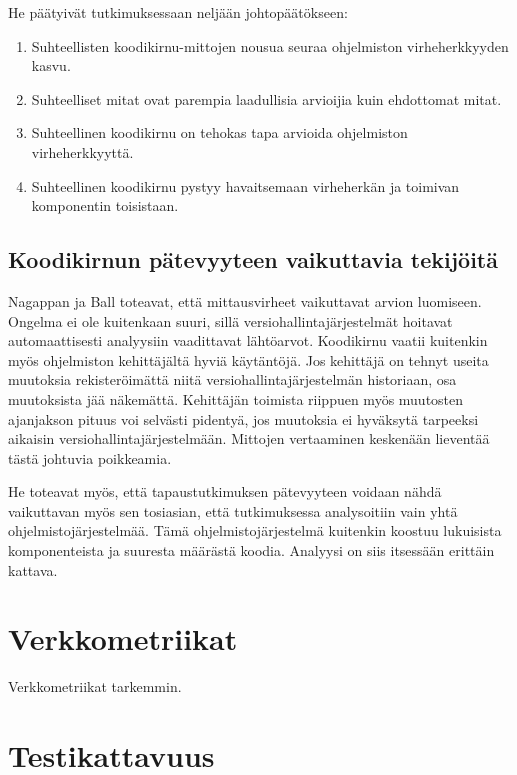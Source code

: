 \documentclass[finnish]{../tktltiki2}
\theoremstyle{definition}
\theoremstyle{remark}
\begin{document}
\noindent He päätyivät tutkimuksessaan neljään johtopäätökseen:

\begin{enumerate}

    \item Suhteellisten koodikirnu-mittojen nousua seuraa ohjelmiston virheherkkyyden kasvu.

    \item Suhteelliset mitat ovat parempia laadullisia arvioijia kuin ehdottomat mitat.

    \item Suhteellinen koodikirnu on tehokas tapa arvioida ohjelmiston virheherkkyyttä.

    \item Suhteellinen koodikirnu pystyy havaitsemaan virheherkän ja toimivan komponentin toisistaan.

\end{enumerate}

\subsection{Koodikirnun pätevyyteen vaikuttavia tekijöitä}

Nagappan ja Ball toteavat, että mittausvirheet vaikuttavat arvion luomiseen. Ongelma ei ole kuitenkaan suuri, sillä 
versiohallintajärjestelmät hoitavat automaattisesti analyysiin vaadittavat lähtöarvot. Koodikirnu vaatii kuitenkin myös 
ohjelmiston kehittäjältä hyviä käytäntöjä. Jos kehittäjä on tehnyt useita muutoksia rekisteröimättä niitä 
versiohallintajärjestelmän historiaan, osa muutoksista jää näkemättä. Kehittäjän toimista riippuen myös muutosten 
ajanjakson pituus voi selvästi pidentyä, jos muutoksia ei hyväksytä tarpeeksi aikaisin versiohallintajärjestelmään. 
Mittojen vertaaminen keskenään lieventää tästä johtuvia poikkeamia.

    He toteavat myös, että tapaustutkimuksen pätevyyteen voidaan nähdä vaikuttavan myös sen tosiasian, että 
tutkimuksessa analysoitiin vain yhtä ohjelmistojärjestelmää. Tämä ohjelmistojärjestelmä kuitenkin koostuu lukuisista 
komponenteista ja suuresta määrästä koodia. Analyysi on siis itsessään erittäin kattava.

\section{Verkkometriikat}

Verkkometriikat tarkemmin.

\section{Testikattavuus}
\end{document}
